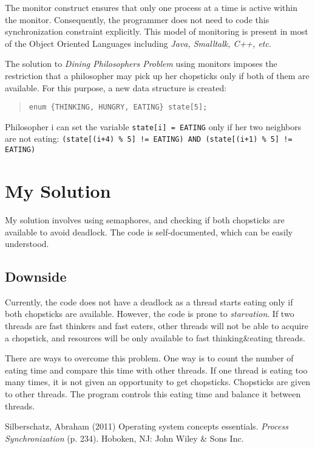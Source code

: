 \documentclass[a4paper,12pt]{article}
\begin{document}
The monitor construct ensures that only one process at a time is active
within the monitor. Consequently, the programmer does not need to code
this synchronization constraint explicitly. This model of monitoring is
present in most of the Object Oriented Languages including \emph{Java,
Smalltalk, C++, etc}.

The solution to \emph{Dining Philosophers Problem} using monitors
imposes the restriction that a philosopher may pick up her chopsticks
only if both of them are available. For this purpose, a new data
structure is created:

\begin{quote}
\begin{verbatim}
enum {THINKING, HUNGRY, EATING} state[5];
\end{verbatim}
\end{quote}

Philosopher i can set the variable \texttt{state[i] = EATING} only if
her two neighbors are not eating: \texttt{(state[(i+4) \% 5] !=
EATING) AND (state[(i+1) \% 5] != EATING)}



\section{My Solution} %
\label{sec:My Solution}

My solution involves using semaphores, and checking if both chopsticks
are available to avoid deadlock. The code is self-documented, which can
be easily understood.

\subsection{Downside} %
\label{sub:Downside}

Currently, the code does not have a deadlock as a thread starts eating
only if both chopsticks are available. However, the code is prone to
\emph{starvation}. If two threads are fast thinkers and fast eaters,
other threads will not be able to acquire a chopstick, and resources
will be only available to fast thinking\&eating threads.

There are ways to overcome this problem. One way is to count the number
of eating time and compare this time with other threads. If one thread
is eating too many times, it is not given an opportunity to get
chopsticks. Chopsticks are given to other threads. The program controls
this eating time and balance it between threads.




\begin{thebibliography}{9}
        Silberschatz, Abraham (2011)
        Operating system concepts essentials.
        \emph{Process Synchronization} (p. 234).
        Hoboken, NJ: John Wiley \& Sons Inc.
\end{thebibliography}
\end{document}
